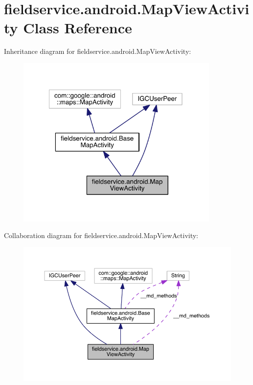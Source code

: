 \hypertarget{classfieldservice_1_1android_1_1_map_view_activity}{\section{fieldservice.\+android.\+Map\+View\+Activity Class Reference}
\label{classfieldservice_1_1android_1_1_map_view_activity}
}


Inheritance diagram for fieldservice.\+android.\+Map\+View\+Activity\+:
\nopagebreak
\begin{figure}[H]
\begin{center}
\leavevmode
\includegraphics[width=284pt]{classfieldservice_1_1android_1_1_map_view_activity__inherit__graph}
\end{center}
\end{figure}


Collaboration diagram for fieldservice.\+android.\+Map\+View\+Activity\+:
\nopagebreak
\begin{figure}[H]
\begin{center}
\leavevmode
\includegraphics[width=350pt]{classfieldservice_1_1android_1_1_map_view_activity__coll__graph}
\end{center}
\end{figure}
